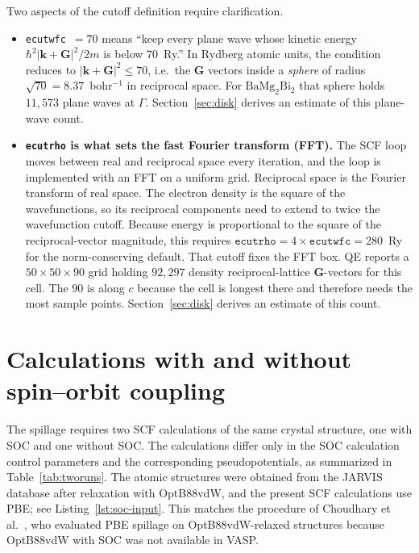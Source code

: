 \documentclass[11pt]{article}
\newcommand{\kk}{\mathbf{k}}
\newcommand{\GG}{\mathbf{G}}
\newcommand{\bmb}{\mathrm{BaMg_2Bi_2}}
\begin{document}
Two aspects of the cutoff definition require clarification.

\begin{itemize}[leftmargin=1.4em,itemsep=2pt]
\item \texttt{ecutwfc}~$=70$ means ``keep every plane wave whose kinetic energy
$\hbar^2|\kk+\GG|^2/2m$ is below $70$~Ry.'' In Rydberg atomic units, the condition reduces to
$|\kk+\GG|^2 \le 70$, i.e.\ the $\GG$ vectors inside a
\emph{sphere} of radius $\sqrt{70}=8.37$~bohr$^{-1}$ in reciprocal space. For $\bmb$ that sphere holds
$11{,}573$ plane waves at $\Gamma$. Section~\ref{sec:disk} derives an estimate of this plane-wave
count.
\item \textbf{\texttt{ecutrho} is what sets the fast Fourier transform (FFT).} The SCF loop moves
between real and reciprocal space every iteration, and the loop is implemented with an FFT on a
uniform grid. Reciprocal space is the Fourier transform of real space. The electron density is the
square of the wavefunctions, so its reciprocal components need to extend to twice the wavefunction
cutoff. Because energy is proportional to the square of the reciprocal-vector magnitude, this
requires $\texttt{ecutrho}=4\times\texttt{ecutwfc}=280$~Ry for the norm-conserving default. That
cutoff fixes the FFT box. QE reports a $50\times50\times90$ grid holding $92{,}297$ density
reciprocal-lattice $\GG$-vectors for this cell. The $90$ is along $c$ because the cell is longest
there and therefore needs the most sample points. Section~\ref{sec:disk} derives an estimate of this
count.
\end{itemize}

\section{Calculations with and without spin--orbit coupling}

The spillage requires two SCF calculations of the same crystal structure, one with SOC and one
without SOC. The calculations differ only in the SOC calculation control parameters and the
corresponding pseudopotentials, as summarized in Table~\ref{tab:tworuns}.
The atomic structures were obtained from the JARVIS database after relaxation with OptB88vdW,
and the present SCF calculations use PBE; see Listing~\ref{lst:soc-input}. This matches the procedure of Choudhary
et al.~\cite{choudhary2019}, who evaluated PBE spillage on OptB88vdW-relaxed structures because
OptB88vdW with SOC was not available in VASP.
\end{document}
